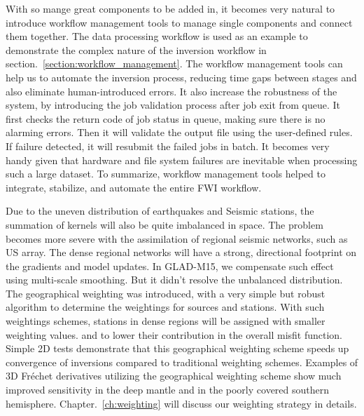 With so mange great components to be added in, it becomes very natural to introduce
workflow management tools to manage single components and connect them together. The data processing
workflow is used as an example to demonstrate the complex nature of the inversion workflow
in section.~\ref{section:workflow_management}. The workflow management tools can help us
to automate the inversion process, reducing time gaps between stages and also eliminate
human-introduced errors. It also increase the robustness of the system, by introducing
the job validation process after job exit from queue. It first checks the return code
of job status in queue, making sure there is no alarming errors. Then it will validate the
output file using the user-defined rules. If failure detected, it will resubmit the failed 
jobs in batch. It becomes very handy given that
hardware and file system failures are inevitable when processing such a large dataset.
To summarize, workflow management tools helped to integrate, stabilize, and automate
the entire FWI workflow.

Due to the uneven distribution of earthquakes and Seismic stations, the summation of
kernels will also be quite imbalanced in space. The problem becomes more severe with
the assimilation of regional seismic networks, such as US array. The dense regional
networks will have a strong, directional footprint on the gradients and model updates.
In GLAD-M15, we compensate such effect using multi-scale smoothing. But it didn't resolve
the unbalanced distribution. The geographical weighting was introduced, with a very simple
but robust algorithm to determine the weightings for sources and stations. With such 
weightings schemes, stations in dense regions will be assigned with smaller weighting values.
and to lower their contribution in the overall misfit function.
Simple 2D tests demonstrate that this geographical weighting scheme speeds up convergence of inversions
compared to traditional weighting schemes.
Examples of 3D Fr\'echet derivatives utilizing the geographical weighting scheme show much improved sensitivity in the deep mantle and in the poorly covered southern hemisphere.
Chapter.~\ref{ch:weighting} will discuss our weighting strategy in details.

